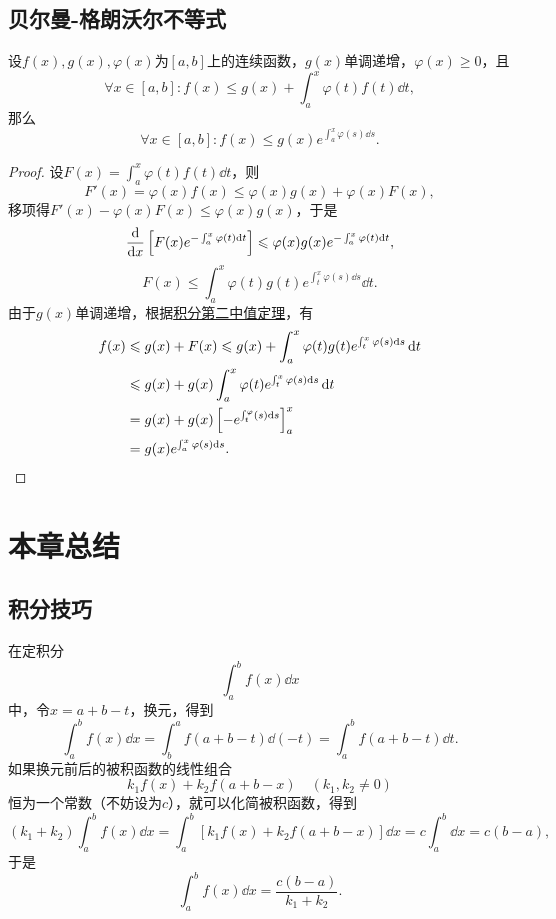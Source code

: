 \subsection{贝尔曼-格朗沃尔不等式}
\begin{theorem}\label{theorem:定积分.贝尔曼-格朗沃尔不等式}
设\(f(x),g(x),\varphi(x)\)为\([a,b]\)上的连续函数，\(g(x)\)单调递增，\(\varphi(x)\geqslant0\)，且\[
\forall x \in [a,b] : f(x) \leqslant g(x) + \int_a^x \varphi(t) f(t) \dd{t},
\]那么\[
\forall x \in [a,b] : f(x) \leqslant g(x) e^{\int_a^x \varphi(s) \dd{s}}.
\]
\begin{proof}
设\(F(x) = \int_a^x \varphi(t) f(t) \dd{t}\)，则\[
F'(x) = \varphi(x) f(x) \leqslant \varphi(x) g(x) + \varphi(x) F(x),
\]移项得\(F'(x) - \varphi(x) F(x) \leqslant \varphi(x) g(x)\)，于是\[
\dv{x}\left[F(x) e^{-\int_a^x \varphi(t) \dd{t}}\right]
\leqslant \varphi(x) g(x) e^{-\int_a^x \varphi(t) \dd{t}},
\]\[
F(x) \leqslant \int_a^x \varphi(t) g(t) e^{\int_t^x \varphi(s) \dd{s}} \dd{t}.
\]由于\(g(x)\)单调递增，根据\hyperref[theorem:定积分.积分中值定理2]{积分第二中值定理}，有\begin{align*}
f(x) &\leqslant g(x) + F(x)
\leqslant g(x) + \int_a^x \varphi(t) g(t) e^{\int_t^x \varphi(s) \dd{s}} \dd{t} \\
&\leqslant g(x) + g(x) \int_a^x \varphi(t) e^{\int_t^x \varphi(s) \dd{s}} \dd{t} \\
&= g(x) + g(x) \left[-e^{\int_t^ \varphi(s) \dd{s}}\right]_a^x \\
&= g(x) e^{\int_a^x \varphi(s) \dd{s}}.
\qedhere
\end{align*}
\end{proof}
\end{theorem}

\section{本章总结}
\subsection{积分技巧}

在定积分\[
\int_a^b f(x) \dd{x}
\]中，令\(x=a+b-t\)，换元，得到\[
\int_a^b f(x) \dd{x}
= \int_b^a f(a+b-t) \dd(-t)
= \int_a^b f(a+b-t) \dd{t}.
\]如果换元前后的被积函数的线性组合\[
k_1 f(x) + k_2 f(a+b-x) \quad(k_1,k_2\neq0)
\]恒为一个常数（不妨设为\(c\)），就可以化简被积函数，得到\[
(k_1 + k_2) \int_a^b f(x) \dd{x}
= \int_a^b [k_1 f(x) + k_2 f(a+b-x)] \dd{x}
= c \int_a^b \dd{x} = c(b-a),
\]于是\[
\int_a^b f(x) \dd{x}
= \frac{c(b-a)}{k_1 + k_2}.
\]

